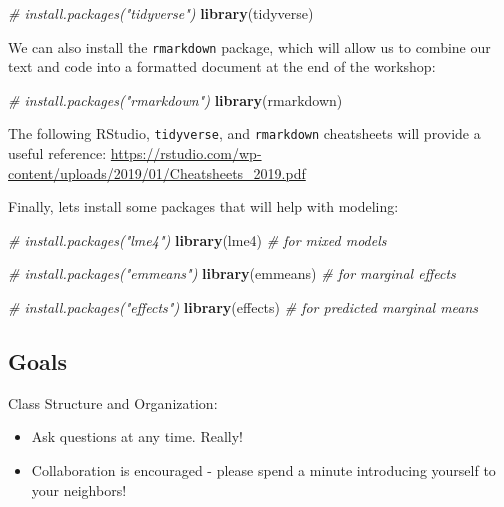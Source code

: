 \documentclass[]{book}
\newenvironment{Shaded}{\begin{snugshade}}{\end{snugshade}}
\newcommand{\KeywordTok}[1]{\textcolor[rgb]{0.13,0.29,0.53}{\textbf{#1}}}
\newcommand{\CommentTok}[1]{\textcolor[rgb]{0.56,0.35,0.01}{\textit{#1}}}
\newcommand{\NormalTok}[1]{#1}
\providecommand{\tightlist}{%
  \setlength{\itemsep}{0pt}\setlength{\parskip}{0pt}}
\begin{document}
\begin{Shaded}
\begin{Highlighting}[]
\CommentTok{# install.packages("tidyverse")}
\KeywordTok{library}\NormalTok{(tidyverse)}
\end{Highlighting}
\end{Shaded}

We can also install the \texttt{rmarkdown} package, which will allow us
to combine our text and code into a formatted document at the end of the
workshop:

\begin{Shaded}
\begin{Highlighting}[]
\CommentTok{# install.packages("rmarkdown")}
\KeywordTok{library}\NormalTok{(rmarkdown)}
\end{Highlighting}
\end{Shaded}

The following RStudio, \texttt{tidyverse}, and \texttt{rmarkdown}
cheatsheets will provide a useful reference:
\url{https://rstudio.com/wp-content/uploads/2019/01/Cheatsheets_2019.pdf}

Finally, lets install some packages that will help with modeling:

\begin{Shaded}
\begin{Highlighting}[]
\CommentTok{# install.packages("lme4")}
\KeywordTok{library}\NormalTok{(lme4)  }\CommentTok{# for mixed models}

\CommentTok{# install.packages("emmeans")}
\KeywordTok{library}\NormalTok{(emmeans)  }\CommentTok{# for marginal effects}

\CommentTok{# install.packages("effects")}
\KeywordTok{library}\NormalTok{(effects)  }\CommentTok{# for predicted marginal means}
\end{Highlighting}
\end{Shaded}

\subsection{Goals}\label{goals}

Class Structure and Organization:

\begin{itemize}
\tightlist
\item
  Ask questions at any time. Really!
\item
  Collaboration is encouraged - please spend a minute introducing
  yourself to your neighbors!
\end{itemize}
\end{document}
